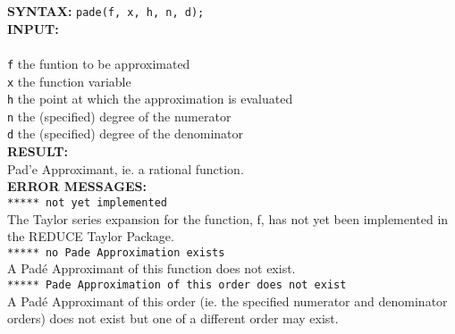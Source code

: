 \hypertarget{PADE:operator}{}

\textbf{SYNTAX:} \hspace{5mm} \texttt{pade(f, x, h, n, d);}\\[\baselineskip]

\textbf{INPUT:}\\\\
\texttt{f} \hspace{6mm} the funtion to be approximated\\
\texttt{x} \hspace{6mm} the function variable\\
\texttt{h} \hspace{6mm} the point at which the approximation is evaluated\\
\texttt{n} \hspace{6mm} the (specified) degree of the numerator\\
\texttt{d} \hspace{6mm} the (specified) degree of the denominator\\[\baselineskip]
\textbf{RESULT:} \\
Pad\a'{e} Approximant, ie. a rational function.\\[\baselineskip]

\textbf{ERROR MESSAGES:}\\

 \hspace{6mm} \texttt{***** not yet implemented}\\

The Taylor series expansion for the function, f, has not yet
been implemented in the {\small REDUCE} Taylor Package.\\[\baselineskip]

 \hspace{6mm} \texttt{***** no Pade Approximation exists}\\

A Pad\'{e} Approximant of this function does not exist.\\[\baselineskip]

 \hspace{6mm} \texttt{***** Pade Approximation of this order does not exist}\\

A Pad\'{e} Approximant of this order (ie. the specified
numerator and denominator orders) does not exist but one
of a different order may exist.\\[\baselineskip]

